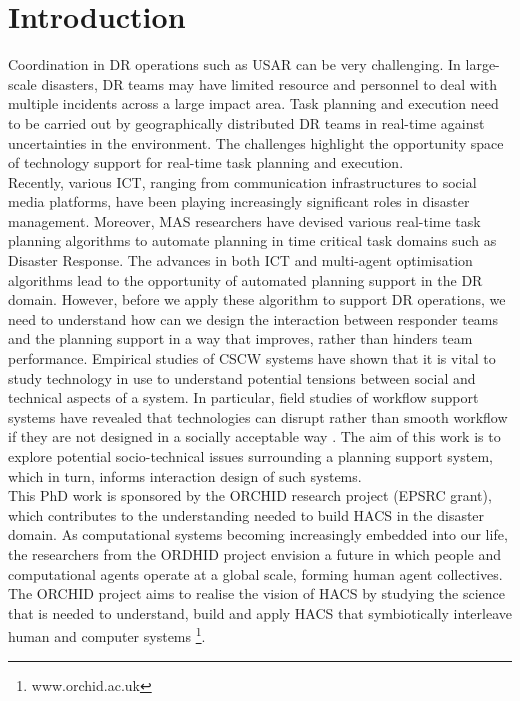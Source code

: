 \chapter{Introduction}\label{ch:introduction}
Coordination in \acf{DR} operations such as \acf{USAR} can be very challenging. In large-scale disasters, \ac{DR} teams may have limited resource and personnel to deal with multiple incidents across a large impact area. Task planning and execution need to be carried out by geographically distributed \ac{DR} teams in real-time against uncertainties in the environment. The challenges highlight the opportunity space of technology support for real-time task planning and execution.  \\ 

Recently, various \acf{ICT}, ranging from communication infrastructures to social media platforms, have been playing increasingly significant roles in  disaster management.  Moreover, \acf{MAS} researchers have devised various real-time task planning algorithms to automate planning in time critical task domains such as Disaster Response. The advances in both \ac{ICT} and multi-agent optimisation algorithms lead to the opportunity of automated planning support in the \ac{DR} domain. However, before we apply these algorithm to support \ac{DR} operations, we need to understand how can we design the interaction between responder teams and the planning support in a way that improves, rather than hinders team performance. Empirical studies of \acf{CSCW} systems have shown that it is vital to study technology in use to understand potential tensions between social and technical aspects of a system. In particular, field studies of workflow support systems have revealed that technologies can disrupt rather than smooth workflow if they are not designed in a socially acceptable way \citep{Bowers1994}. The aim of this work is to explore potential socio-technical issues surrounding a planning support system, which in turn, informs interaction design of such systems. \\

This PhD work is sponsored by the ORCHID research project (EPSRC grant), which contributes to the understanding needed to build \acf{HACS} in the disaster domain. As computational systems  becoming increasingly embedded into our life, the researchers from the ORDHID project envision a future in which people and computational agents operate at a global scale, forming human agent collectives. The ORCHID project aims to realise the vision of \ac{HACS} by studying the science that is needed to understand, build and apply \ac{HACS} that symbiotically interleave human and computer systems \footnote{www.orchid.ac.uk}.\\

